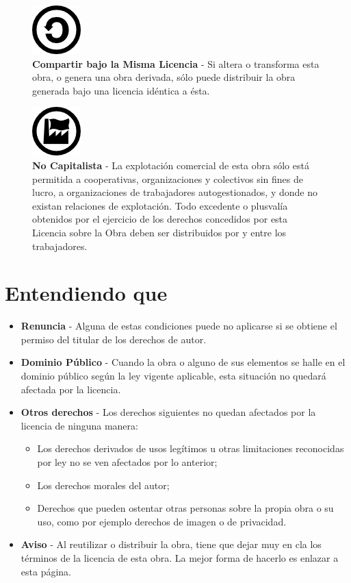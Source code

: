 \documentclass[
]{book}
\begin{document}
\begin{figure}
\centering
\includegraphics{images/sa.png}
\caption{\textbf{Compartir bajo la Misma Licencia} - Si altera o transforma esta obra, o
genera una obra derivada, sólo puede distribuir la obra generada bajo una
licencia idéntica a ésta.}
\end{figure}

\begin{figure}
\centering
\includegraphics{images/nc.png}
\caption{\textbf{No Capitalista} - La explotación comercial de esta obra sólo está permitida
a cooperativas, organizaciones y colectivos sin fines de lucro, a
organizaciones de trabajadores autogestionados, y donde no existan relaciones
de explotación. Todo excedente o plusvalía obtenidos por el ejercicio de los
derechos concedidos por esta Licencia sobre la Obra deben ser distribuidos por y
entre los trabajadores.}
\end{figure}

\hypertarget{entendiendo-que}{%
\section*{Entendiendo que}\label{entendiendo-que}}

\begin{itemize}
\item
  \textbf{Renuncia} - Alguna de estas condiciones puede no aplicarse si se obtiene
  el permiso del titular de los derechos de autor.
\item
  \textbf{Dominio Público} - Cuando la obra o alguno de sus elementos se halle en
  el dominio público según la ley vigente aplicable, esta situación no quedará
  afectada por la licencia.
\item
  \textbf{Otros derechos} - Los derechos siguientes no quedan afectados por
  la licencia de ninguna manera:

  \begin{itemize}
  \item
    Los derechos derivados de usos legítimos u otras limitaciones
    reconocidas por ley no se ven afectados por lo anterior;
  \item
    Los derechos morales del autor;
  \item
    Derechos que pueden ostentar otras personas sobre la propia obra o
    su uso, como por ejemplo derechos de imagen o de privacidad.
  \end{itemize}
\item
  \textbf{Aviso} - Al reutilizar o distribuir la obra, tiene que dejar muy en cla
  los términos de la licencia de esta obra. La mejor forma de hacerlo es
  enlazar a esta página.
\end{itemize}
\end{document}
